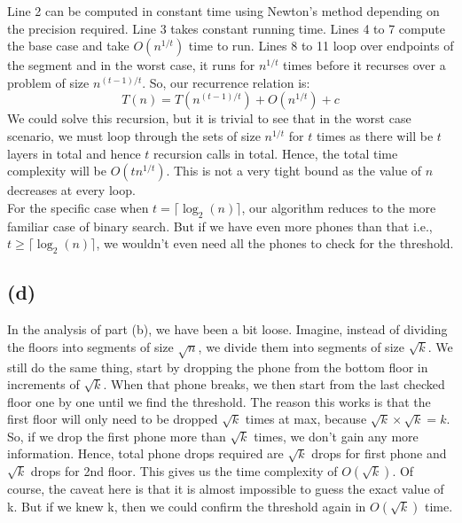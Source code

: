 \documentclass[a4paper,12pt]{article} %
\begin{document}
Line 2 can be computed in constant time using Newton's method depending on the precision required. Line 3 takes constant running time. Lines 4 to 7 compute the base case and take $O(n^{1/t})$ time to run. Lines 8 to 11 loop over endpoints of the segment and in the worst case, it runs for $n^{1/t}$ times before it recurses over a problem of size $n^{(t-1)/t}$. So, our recurrence relation is:\\
\begin{equation*}
    T(n) = T(n^{(t-1)/t}) + O(n^{1/t}) + c
\end{equation*}
We could solve this recursion, but it is trivial to see that in the worst case scenario, we must loop through the sets of size $n^{1/t}$ for $t$ times as there will be $t$ layers in total and hence $t$ recursion calls in total. Hence, the total time complexity will be $O(tn^{1/t})$. This is not a very tight bound as the value of $n$ decreases at every loop. \\
For the specific case when $t = \lceil\log_2(n)\rceil$, our algorithm reduces to the more familiar case of binary search. But if we have even more phones than that i.e., $t \geq \lceil\log_2(n)\rceil$, we wouldn't even need all the phones to check for the threshold. 

\subsection*{(d)}
In the analysis of part (b), we have been a bit loose. Imagine, instead of dividing the floors into segments of size $\sqrt{n}$, we divide them into segments of size $\sqrt{k}$. We still do the same thing, start by dropping the phone from the bottom floor in increments of $\sqrt{k}$. When that phone breaks, we then start from the last checked floor one by one until we find the threshold. The reason this works is that the first floor will only need to be dropped $\sqrt{k}$ times at max, because $\sqrt{k}\times \sqrt{k} = k$. So, if we drop the first phone more than $\sqrt{k}$ times, we don't gain any more information. Hence, total phone drops required are $\sqrt{k}$ drops for first phone and $\sqrt{k}$ drops for 2nd floor. This gives us the time complexity of $O(\sqrt{k})$. Of course, the caveat here is that it is almost impossible to guess the exact value of k. But if we knew k, then we could confirm the threshold again in $O(\sqrt{k})$ time.
\end{document}
